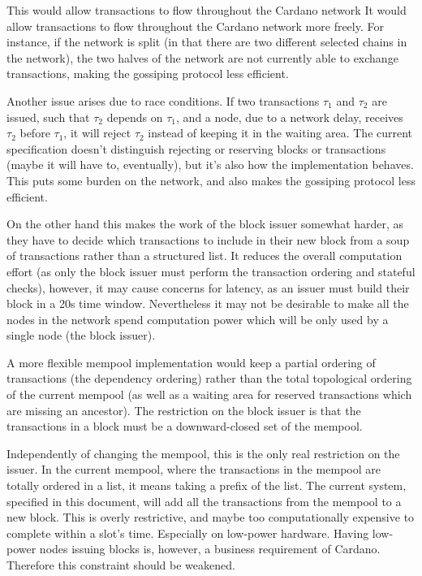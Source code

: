 \documentclass{article}
\begin{document}
This would allow transactions to flow throughout the Cardano network
It would allow transactions to flow throughout the Cardano network
more freely. For instance, if the network is split (in that there are
two different selected chains in the network), the two halves of the
network are not currently able to exchange transactions, making the
gossiping protocol less efficient.

Another issue arises due to race conditions. If two transactions $τ_1$ and $τ_2$
are issued, such that $τ_2$ depends on $τ_1$, and a node, due to a network
delay, receives $τ_2$ before $τ_1$, it will reject $τ_2$ instead of keeping it
in the waiting area. The current specification doesn't distinguish rejecting or
reserving blocks or transactions (maybe it will have to, eventually), but it's
also how the implementation behaves. This puts some burden on the network, and
also makes the gossiping protocol less efficient.

On the other hand this makes the work of the block issuer somewhat harder,
as they have to decide which transactions to include in their new
block from a soup of transactions rather than a structured list. It
reduces the overall computation effort (as only the block issuer must
perform the transaction ordering and stateful checks), however, it may
cause concerns for latency, as an issuer must build their block in a
20s time window. Nevertheless it may not be desirable to make all the
nodes in the network spend computation power which will be only used
by a single node (the block issuer).

A more flexible mempool implementation would keep a partial ordering
of transactions (the dependency ordering) rather than the total
topological ordering of the current mempool (as well as a waiting area
for reserved transactions which are missing an ancestor). The
restriction on the block issuer is that the transactions in a block
must be a downward-closed set of the mempool.

Independently of changing the mempool, this is the only real
restriction on the issuer. In the current mempool, where the
transactions in the mempool are totally ordered in a list, it means
taking a prefix of the list. The current system, specified in this
document, will add all the transactions from the mempool to a new
block. This is overly restrictive, and maybe too computationally
expensive to complete within a slot's time. Especially on low-power
hardware. Having low-power nodes issuing blocks is, however, a business
requirement of Cardano. Therefore this constraint should be weakened.
\end{document}
